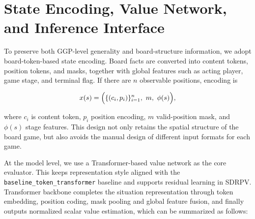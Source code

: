 \section{State Encoding, Value Network, and Inference Interface}


To preserve both GGP-level generality and board-structure information, we adopt board-token-based state encoding. Board facts are converted into content tokens, position tokens, and masks, together with global features such as acting player, game stage, and terminal flag. If there are $n$ observable positions, encoding is



\begin{equation}
x(s)=\Bigl(\{(c_i,p_i)\}_{i=1}^{n},\ m,\ \phi(s)\Bigr),
\end{equation}

where $c_i$ is content token, $p_i$ position encoding, $m$ valid-position mask, and $\phi(s)$ stage features. This design not only retains the spatial structure of the board game, but also avoids the manual design of different input formats for each game.


At the model level, we use a Transformer-based value network as the core evaluator. This keeps representation style aligned with the \texttt{baseline_token_transformer} baseline and supports residual learning in SDRPV. Transformer backbone completes the situation representation through token embedding, position coding, mask pooling and global feature fusion, and finally outputs normalized scalar value estimation, which can be summarized as follows:

